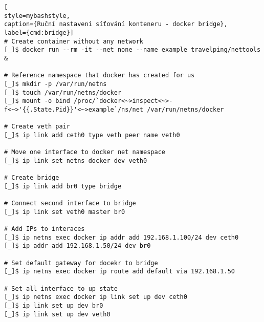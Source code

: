 \begin{lstfloat}
\begin{lstlisting}[
style=mybashstyle,
caption={Ruční nastavení síťování konteneru - docker bridge},
label={cmd:bridge}]
# Create container without any network
[_]$ docker run --rm -it --net none --name example travelping/nettools &

# Reference namespace that docker has created for us
[_]$ mkdir -p /var/run/netns
[_]$ touch /var/run/netns/docker
[_]$ mount -o bind /proc/`docker<~>inspect<~>-f<~>'{{.State.Pid}}'<~>example`/ns/net /var/run/netns/docker

# Create veth pair
[_]$ ip link add ceth0 type veth peer name veth0

# Move one interface to docker net namespace 
[_]$ ip link set netns docker dev veth0

# Create bridge
[_]$ ip link add br0 type bridge

# Connect second interface to bridge
[_]$ ip link set veth0 master br0

# Add IPs to interaces
[_]$ ip netns exec docker ip addr add 192.168.1.100/24 dev ceth0
[_]$ ip addr add 192.168.1.50/24 dev br0

# Set default gateway for docekr to bridge
[_]$ ip netns exec docker ip route add default via 192.168.1.50

# Set all interface to up state
[_]$ ip netns exec docker ip link set up dev ceth0
[_]$ ip link set up dev br0
[_]$ ip link set up dev veth0
\end{lstlisting}
\end{lstfloat}